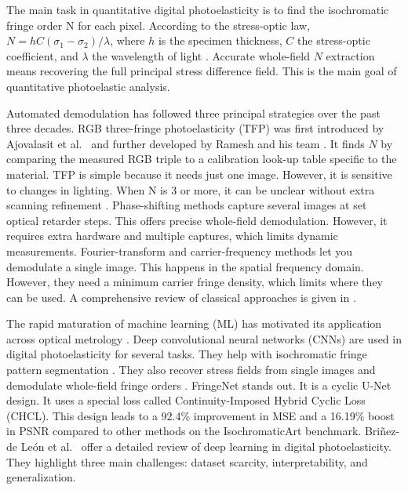 \documentclass[review,12pt]{elsarticle}
\begin{document}
The main task in quantitative digital photoelasticity is to find the isochromatic fringe order N for each pixel. According to the stress-optic law, $N = hC(\sigma_1 - \sigma_2)/\lambda$, where $h$ is the specimen thickness, $C$ the stress-optic coefficient, and $\lambda$ the wavelength of light \cite{dally1991}. Accurate whole-field $N$ extraction means recovering the full principal stress difference field. This is the main goal of quantitative photoelastic analysis.

Automated demodulation has followed three principal strategies over the past three decades. RGB three-fringe photoelasticity (TFP) was first introduced by Ajovalasit et al.\ \cite{ajovalasit1995} and further developed by Ramesh and his team \cite{ramesh1996,ramesh2011,madhu2007}. It finds $N$ by comparing the measured RGB triple to a calibration look-up table specific to the material. TFP is simple because it needs just one image. However, it is sensitive to changes in lighting. When N is 3 or more, it can be unclear without extra scanning refinement \cite{kale2013,ramesh2015}. Phase-shifting methods \cite{wang1995,ramesh1996phaseshifting,siegmann2005} capture several images at set optical retarder steps. This offers precise whole-field demodulation. However, it requires extra hardware and multiple captures, which limits dynamic measurements. Fourier-transform and carrier-frequency methods \cite{quan1993,morimoto1994} let you demodulate a single image. This happens in the spatial frequency domain. However, they need a minimum carrier fringe density, which limits where they can be used. A comprehensive review of classical approaches is given in \cite{ajovalasit2015,ramesh2021}.

The rapid maturation of machine learning (ML) has motivated its application across optical metrology \cite{zhu2022}. Deep convolutional neural networks (CNNs) are used in digital photoelasticity for several tasks. They help with isochromatic fringe pattern segmentation \cite{brinezdeleon2022}. They also recover stress fields from single images \cite{tao2022,naranjo2022} and demodulate whole-field fringe orders \cite{mohan2024}. FringeNet \cite{mohan2024} stands out. It is a cyclic U-Net design. It uses a special loss called Continuity-Imposed Hybrid Cyclic Loss (CHCL). This design leads to a 92.4\% improvement in MSE and a 16.19\% boost in PSNR compared to other methods on the IsochromaticArt benchmark. Bri\~nez-de Le\'{o}n et al.\ \cite{brinezdeleon2024} offer a detailed review of deep learning in digital photoelasticity. They highlight three main challenges: dataset scarcity, interpretability, and generalization.
\end{document}
